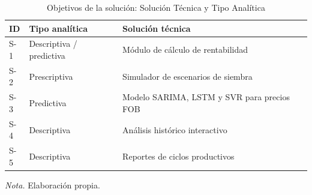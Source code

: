 \begin{table}[H]
\centering
\caption{Objetivos de la soluci\'on: Soluci\'on T\'ecnica y Tipo Anal\'itica}
\label{tab:objetivos_solucion}
\small
\begin{tabularx}{\textwidth}{p{2cm}p{3.5cm}X}
\toprule
\textbf{ID} & \textbf{Tipo anal\'itica} & \textbf{Soluci\'on t\'ecnica} \\
\midrule
S-1 & Descriptiva / predictiva & M\'odulo de c\'alculo de rentabilidad \\
S-2 & Prescriptiva & Simulador de escenarios de siembra \\
S-3 & Predictiva & Modelo SARIMA, LSTM y SVR para precios FOB \\
S-4 & Descriptiva & An\'alisis hist\'orico interactivo \\
S-5 & Descriptiva & Reportes de ciclos productivos \\
\bottomrule
\end{tabularx}
\parbox{0.94\textwidth}{\small \textit{Nota.} Elaboraci\'on propia.}
\end{table}
